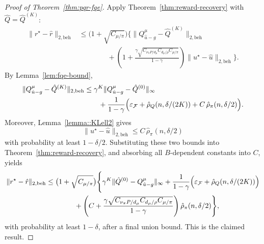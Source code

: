 \begin{proof}[Proof of Theorem~\ref{thm:pqr-fqe}]
Apply Theorem~\ref{thm:reward-recovery} with \(\hat Q=\hat Q^{(K)}\):
\begin{align*}
\|r^\star-\hat r\|_{2,\mathrm{beh}}
&\le
\bigl(1+\sqrt{C_{\mu/\pi}}\bigr)
\Bigg\{
\|Q^\mu_{\hat u-g}-\hat Q^{(K)}\|_{2,\mathrm{beh}}\\
&\qquad\qquad+
\left(
1+\frac{\gamma\sqrt{C_{\nu_\pi P/d_\mu}C_{d_\mu/\rho}C_{\mu/\pi}}}{1-\gamma}
\right)
\|u^\star-\hat u\|_{2,\mathrm{beh}}
\Bigg\}.
\end{align*}
By Lemma~\ref{lem:fqe-bound},
\begin{align*}
\|Q^\mu_{\hat u-g}-\hat Q^{(K)}\|_{2,\mathrm{beh}}
&\le
\gamma^K\|Q^\mu_{\hat u-g}-\hat Q^{(0)}\|_{\infty}\\
&\qquad+
\frac{1}{1-\gamma}
\Bigl(
\varepsilon_{\mathcal F}
+\hat\rho_Q(n,\delta/(2K))
+ C\,\hat\rho_\pi(n,\delta/2)
\Bigr).
\end{align*}
Moreover, Lemma~\ref{lemma::KLell2} gives
\[
\|u^\star-\hat u\|_{2,\mathrm{beh}}
\le
C\,\hat\rho_\pi(n,\delta/2)
\]
with probability at least \(1-\delta/2\). Substituting these two bounds into
Theorem~\ref{thm:reward-recovery}, and absorbing all \(B\)-dependent constants
into \(C\), yields
\begin{align*}
\|r^\star-\hat r\|_{2,\mathrm{beh}}
&\le
\bigl(1+\sqrt{C_{\mu/\pi}}\bigr)
\Bigg\{
\gamma^K\|\hat Q^{(0)}-Q^\mu_{\hat u-g}\|_{\infty}
+
\frac{1}{1-\gamma}
\Bigl(
\varepsilon_{\mathcal F}
+\hat\rho_Q(n,\delta/(2K))
\Bigr)\\
&\qquad\qquad+
\left(
C
+\frac{\gamma\sqrt{C_{\nu_\pi P/d_{\mu}}C_{d_\mu/\rho}C_{\mu/\pi}}}{1-\gamma}
\right)
\hat\rho_\pi(n,\delta/2)
\Bigg\},
\end{align*}
with probability at least \(1-\delta\), after a final union bound. This is the
claimed result.
\end{proof}
